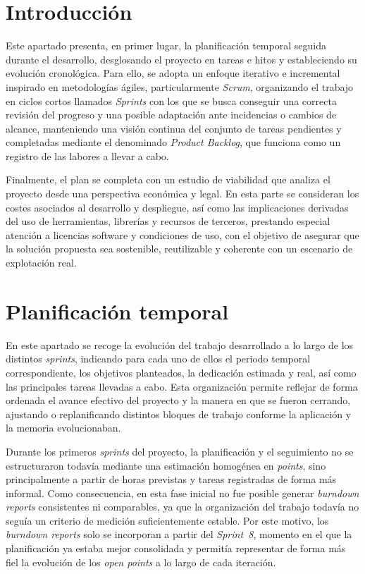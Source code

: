 
\section{Introducción}

Este apartado presenta, en primer lugar, la planificación temporal seguida durante el desarrollo, desglosando el proyecto en tareas e hitos y estableciendo su evolución cronológica. Para ello, se adopta un enfoque iterativo e incremental inspirado en metodologías ágiles, particularmente \textit{Scrum}, organizando el trabajo en ciclos cortos llamados \textit{Sprints} con los que se busca conseguir una correcta revisión del progreso y una posible adaptación ante incidencias o cambios de alcance, manteniendo una visión continua del conjunto de tareas pendientes y completadas mediante el denominado \textit{Product Backlog}, que funciona como un registro de las labores a llevar a cabo.

Finalmente, el plan se completa con un estudio de viabilidad que analiza el proyecto desde una perspectiva económica y legal. En esta parte se consideran los costes asociados al desarrollo y despliegue, así como las implicaciones derivadas del uso de herramientas, librerías y recursos de terceros, prestando especial atención a licencias software y condiciones de uso, con el objetivo de asegurar que la solución propuesta sea sostenible, reutilizable y coherente con un escenario de explotación real.

\section{Planificación temporal}
En este apartado se recoge la evolución del trabajo desarrollado a lo largo de los distintos \textit{sprints}, indicando para cada uno de ellos el periodo temporal correspondiente, los objetivos planteados, la dedicación estimada y real, así como las principales tareas llevadas a cabo. Esta organización permite reflejar de forma ordenada el avance efectivo del proyecto y la manera en que se fueron cerrando, ajustando o replanificando distintos bloques de trabajo conforme la aplicación y la memoria evolucionaban.

Durante los primeros \textit{sprints} del proyecto, la planificación y el seguimiento no se estructuraron todavía mediante una estimación homogénea en \textit{points}, sino principalmente a partir de horas previstas y tareas registradas de forma más informal. Como consecuencia, en esta fase inicial no fue posible generar \textit{burndown reports} consistentes ni comparables, ya que la organización del trabajo todavía no seguía un criterio de medición suficientemente estable. Por este motivo, los \textit{burndown reports} solo se incorporan a partir del \textit{Sprint~8}, momento en el que la planificación ya estaba mejor consolidada y permitía representar de forma más fiel la evolución de los \textit{open points} a lo largo de cada iteración.

